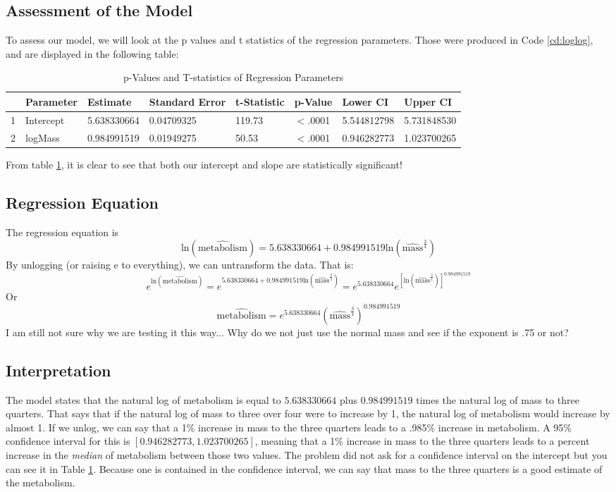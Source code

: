 \documentclass[english]{article}\usepackage[]{graphicx}\usepackage[]{color}
\begin{document}
\subsection{Assessment of the Model}
To assess our model, we will look at the p values and t statistics of the regression parameters. Those were produced in Code \ref{cd:loglog}, and are displayed in the following table:
\begin{table}[H]
\centering
\caption{p-Values and T-statistics of Regression Parameters} 
\label{tab:ptsas}
\begin{tabular}{rlllllll}
  \toprule
 & Parameter & Estimate & Standard Error & t-Statistic & p-Value & Lower CI & Upper CI \\ 
  \midrule
1 & Intercept & 5.638330664 & 0.04709325 & 119.73 & $<$.0001 & 5.544812798 & 5.731848530 \\ 
  2 & logMass & 0.984991519 & 0.01949275 & 50.53 & $<$.0001 & 0.946282773 & 1.023700265 \\ 
   \bottomrule
\end{tabular}
\end{table}


From table \ref{tab:ptsas}, it is clear to see that both our intercept and slope are statistically significant!
\subsection{Regression Equation}
The regression equation is $$ \mathrm{ln}\left(\widehat{\mathrm{metabolism}}\right)=5.638330664+0.984991519\mathrm{ln}\left(\widehat{\mathrm{mass}}^{\frac{3}{4}}\right)$$
By unlogging (or raising e to everything), we can untransform the data. That is:
 $$e^{\mathrm{ln}\left(\widehat{\mathrm{metabolism}}\right)}=e^{5.638330664+0.984991519\mathrm{ln}\left(\widehat{\mathrm{mass}}^{\frac{3}{4}}\right)}=e^{5.638330664}e^{\left[\mathrm{ln}\left(\widehat{\mathrm{mass}}^{\frac{3}{4}}\right)\right]^{0.984991519}}$$
Or
$$\widehat{\mathrm{metabolism}}=e^{5.638330664}\left(\widehat{\mathrm{mass}}^{\frac{3}{4}}\right)^{0.984991519}$$
I am still not sure why we are testing it this way... Why do we not just use the normal mass and see if the exponent is .75 or not? 
\subsection{Interpretation}
The model states that the natural log of metabolism is equal to $5.638330664$ plus $0.984991519$ times the natural log of mass to three quarters. That says that if the natural log of mass to three over four were to increase by 1, the natural log of metabolism would increase by almost 1. If we unlog, we can say that a 1\% increase in mass to the three quarters leads to a .985\% increase in metabolism. A 95\% confidence interval for this is $\left[0.946282773,1.023700265\right]$, meaning that a 1\% increase in mass to the three quarters leads to a percent increase in the \emph{median} of metabolism between those two values. The problem did not ask for a confidence interval on the intercept but you can see it in Table \ref{tab:ptsas}. Because one is contained in the confidence interval, we can say that mass to the three quarters is a good estimate of the metabolism.
\end{document}
